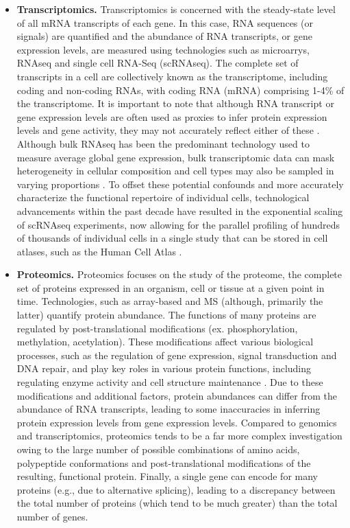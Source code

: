 \begin{itemize}
    \item   \textbf{Transcriptomics.} Transcriptomics is concerned with the steady-state level of all mRNA transcripts of each gene. In this case, RNA sequences (or signals) are quantified and the abundance of RNA transcripts, or gene expression levels, are measured using technologies such as microarrys, RNAseq and single cell RNA-Seq (scRNAseq). The complete set of transcripts in a cell are collectively known as the transcriptome, including coding and non-coding RNAs, with coding RNA (mRNA) comprising 1-4\% of the transcriptome. It is important to note that although RNA transcript or gene expression levels are often used as proxies to infer protein expression levels and gene activity, they may not accurately reflect either of these \parencite{grant2007}. Although bulk RNAseq has been the predominant technology used to measure average global gene expression, bulk transcriptomic data can mask heterogeneity in cellular composition and cell types may also be sampled in varying proportions \parencite{li2021}. To offset these potential confounds and more accurately characterize the functional repertoire of individual cells, technological advancements within the past decade have resulted in the exponential scaling of scRNAseq experiments, now allowing for the parallel profiling of hundreds of thousands of individual cells in a single study \parencite{svensson2018} that can be stored in cell atlases, such as the Human Cell Atlas \parencite{karlsson2021}. 
    
    \item   \textbf{Proteomics.} Proteomics focuses on the study of the proteome, the complete set of proteins expressed in an organism, cell or tissue at a given point in time. Technologies, such as array-based and MS (although, primarily the latter) quantify protein abundance. The functions of many proteins are regulated by post-translational modifications (ex. phosphorylation, methylation, acetylation). These modifications affect various biological processes, such as the regulation of gene expression, signal transduction and DNA repair, and play key roles in various protein functions, including regulating enzyme activity and cell structure maintenance \parencite{ramazi2021}. Due to these modifications and additional factors, protein abundances can differ from the abundance of RNA transcripts, leading to some inaccuracies in inferring protein expression levels from gene expression levels. Compared to genomics and transcriptomics, proteomics tends to be a far more complex investigation owing to the large number of possible combinations of amino acids, polypeptide conformations and post-translational modifications of the resulting, functional protein. Finally, a single gene can encode for many proteins (e.g., due to alternative splicing), leading to a discrepancy between the total number of proteins (which tend to be much greater) than the total number of genes. 
    

\end{itemize}
